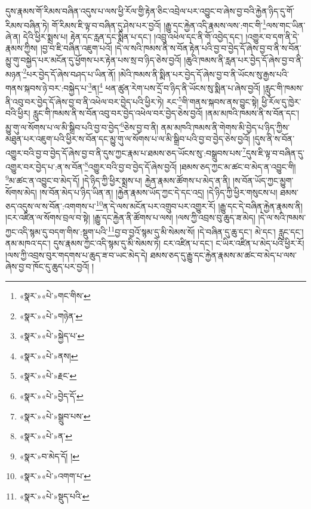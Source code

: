 དུས་རྣམས་གོ་རིམས་བཞིན་འདུས་པ་ལས་ཕྱི་རོལ་གྱི་རྟེན་ཅིང་འབྲེལ་པར་འབྱུང་བ་ཞེས་བྱ་བའི་རྐྱེན་ཉིད་དུ་གོ་རིམས་བཞིན་ཏེ། གོ་རིམས་ཇི་ལྟ་བ་བཞིན་དུ་ཤེས་པར་བྱའོ། །རྒྱུ་དང་རྐྱེན་འདི་རྣམས་ལས་:གང་གི་\footnote{«སྣར་»«པེ་»གང་གིས་}ལས་གང་ཡིན་ཞེ་ན། དེའི་ཕྱིར་སྨྲས་པ། རྟེན་དང་རླན་དང་སྨིན་པ་དང་། །འབྲུ་འཕེལ་དང་ནི་གོ་འབྱེད་དང་། །འགྱུར་བ་དག་ནི་དེ་རྣམས་ཀྱིས། །བྱ་བ་ཇི་བཞིན་འཇུག་པའོ། །དེ་ལ་སའི་ཁམས་ནི་ས་བོན་རྟེན་པའི་བྱ་བ་བྱེད་དོ་ཞེས་བྱ་བ་ནི་ས་བོན་མྱུ་གུ་བསྐྱེད་པར་མངོན་དུ་ཕྱོགས་པར་རྟེན་པས་སྲ་བ་ཉིད་ཅེས་བྱའོ། །ཆུའི་ཁམས་ནི་རླན་པར་བྱེད་དོ་ཞེས་བྱ་བ་ནི་མཉན་\footnote{«སྣར་»«པེ་»གཉེན་}པར་བྱེད་དོ་ཞེས་བཤད་པ་ཡིན་ནོ། །མེའི་ཁམས་ནི་སྨིན་པར་བྱེད་དོ་ཞེས་བྱ་བ་ནི་ཡོངས་སུ་རྒྱས་པའི་གནས་སྐབས་ཉེ་བར་:བསྐྱེད་པ་\footnote{«སྣར་»«པེ་»སྐྱེད་པ་}ན།\footnote{«སྣར་»«པེ་»ནས།} ཕན་ཚུན་རེག་པས་དྲོ་བ་ཉིད་ནི་ཡོངས་སུ་སྨིན་པ་ཞེས་བྱའོ། །རླུང་གི་ཁམས་ནི་འབུ་བར་བྱེད་དོ་ཞེས་བྱ་བ་ནི་འཕེལ་བར་བྱེད་པའི་ཕྱིར་ཏེ། རང་\footnote{«སྣར་»«པེ་»རྗང་}གི་གནས་སྐབས་ནས་བྱུང་སྟེ། ཕྱི་རོལ་དུ་ཁྱེར་བའི་ཕྱིར། རླུང་གི་ཁམས་ནི་ས་བོན་འབུ་བར་བྱེད་འཕེལ་བར་བྱེད་ཅེས་བྱའོ། །ནམ་མཁའི་ཁམས་ནི་ས་བོན་དང་། མྱུ་གུ་ལ་སོགས་པ་ལ་མི་སྒྲིབ་པའི་བྱ་བ་བྱེད་\footnote{«སྣར་»«པེ་»བྱེད་དོ་}ཅེས་བྱ་བ་ནི། ནམ་མཁའི་ཁམས་ནི་གེགས་མི་བྱེད་པ་ཉིད་ཀྱིས་མཐུན་པར་འཇུག་པའི་ཕྱིར་ས་བོན་དང་མྱུ་གུ་ལ་སོགས་པ་ལ་མི་སྒྲིབ་པའི་བྱ་བ་བྱེད་ཅེས་བྱའོ། །དུས་ནི་ས་བོན་འགྱུར་བའི་བྱ་བ་བྱེད་དོ་ཞེས་བྱ་བ་ནི་དུས་ཀྱང་རྣམ་པ་ཐམས་ཅད་ཡོངས་སུ་:བསྒྲུབས་པས་\footnote{«སྣར་»«པེ་»སྒྲུབ་པས་}དུས་ཇི་ལྟ་བ་བཞིན་དུ་འགྱུར་བར་བྱེད་པ་:ན་ས་བོན་\footnote{«སྣར་»«པེ་»ན་}འགྱུར་བའི་བྱ་བ་བྱེད་དོ་ཞེས་བྱའོ། །ཐམས་ཅད་ཀྱང་མ་ཚང་བ་མེད་ན་འབྱུང་གི། \footnote{«སྣར་»བ་མེད་དོ། ། }མ་ཚང་ན་འབྱུང་བ་མེད་དོ། །དེ་ཉིད་ཀྱི་ཕྱིར་སྨྲས་པ། རྐྱེན་རྣམས་ཚོགས་པ་མེད་ན་ནི། །ས་བོན་ཡོད་ཀྱང་མྱུག་སོགས་མེད། །ས་བོན་མེད་པ་ཉིད་ཡིན་ན། །རྐྱེན་རྣམས་ཡོད་ཀྱང་དེ་དང་འདྲ། །དེ་ཉིད་ཀྱི་ཕྱིར་གསུངས་པ། ཐམས་ཅད་འདུས་ལ་ས་བོན་:འགགས་པ་\footnote{«སྣར་»«པེ་»འགག་པ་}ན་དེ་ལས་མངོན་པར་འགྲུབ་པར་འགྱུར་རོ། །རྒྱུ་དང་དེ་བཞིན་རྐྱེན་རྣམས་ནི། །ངར་འཛིན་ལ་སོགས་བྲལ་བ་སྟེ། །རྒྱུ་དང་རྐྱེན་ནི་ཚོགས་པ་ལས། །ལས་ཀྱི་འབྲས་བུ་ཆུད་ཟ་མེད། །དེ་ལ་སའི་ཁམས་ཀྱང་འདི་སྙམ་དུ་བདག་གིས་:སྡུག་པའི་\footnote{«སྣར་»«པེ་»སྡུད་པའི་}བྱ་བ་བྱའོ་སྙམ་དུ་མི་སེམས་སོ། །དེ་བཞིན་དུ་ཆུ་དང་། མེ་དང་། རླུང་དང་། ནམ་མཁའ་དང་། དུས་རྣམས་ཀྱང་འདི་སྙམ་དུ་མི་སེམས་ཏེ། ངར་འཛིན་པ་དང་། ང་ཡིར་འཛིན་པ་མེད་པའི་ཕྱིར་རོ། །ལས་ཀྱི་འབྲས་བུར་གདགས་པ་ཆུད་ཟ་བ་ཡང་མེད་དེ། ཐམས་ཅད་དུ་རྒྱུ་དང་རྐྱེན་རྣམས་མ་ཚང་བ་མེད་པ་ལས་ཞེས་བྱ་བ་ཁོང་དུ་ཆུད་པར་བྱའོ། །
